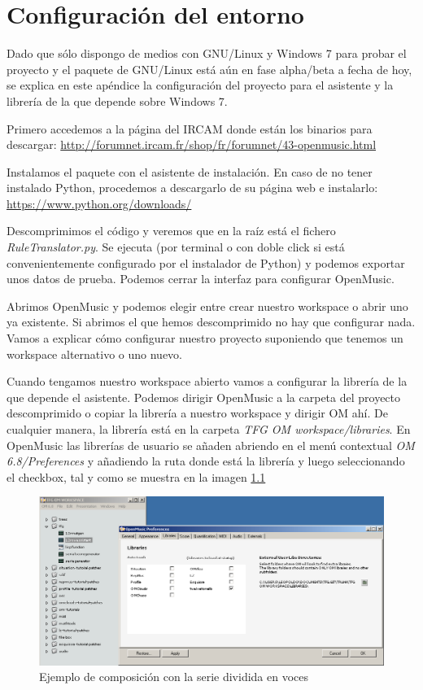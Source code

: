 \documentclass[a4paper,openany,12pt]{memoir}
\begin{document}
\cleardoublepage
{}



\appendix
\chapter{Configuración del entorno}\label{aped.A}
Dado que sólo dispongo de medios con GNU/Linux y Windows 7 para probar el proyecto y el paquete de GNU/Linux está aún en fase alpha/beta a fecha de hoy, se explica en este apéndice la configuración del proyecto para el asistente y la librería de la que depende sobre Windows 7.

Primero accedemos a la página del IRCAM donde están los binarios para descargar: \url{http://forumnet.ircam.fr/shop/fr/forumnet/43-openmusic.html}

Instalamos el paquete con el asistente de instalación. En caso de no tener instalado Python, procedemos a descargarlo de su página web e instalarlo: \url{https://www.python.org/downloads/}

Descomprimimos el código y veremos que en la raíz está el fichero \emph{RuleTranslator.py}. Se ejecuta (por terminal o con doble click si está convenientemente configurado por el instalador de Python) y podemos exportar unos datos de prueba. Podemos cerrar la interfaz para configurar OpenMusic.

Abrimos OpenMusic y podemos elegir entre crear nuestro workspace o abrir uno ya existente. Si abrimos el que hemos descomprimido no hay que configurar nada. Vamos a explicar cómo configurar nuestro proyecto suponiendo que tenemos un workspace alternativo o uno nuevo.

Cuando tengamos nuestro workspace abierto vamos a configurar la librería de la que depende el asistente. Podemos dirigir OpenMusic a la carpeta del proyecto descomprimido o copiar la librería a nuestro workspace y dirigir OM ahí. De cualquier manera, la librería está en la carpeta \emph{TFG OM workspace/libraries}. En OpenMusic las librerías de usuario se añaden abriendo en el menú contextual \emph{OM 6.8/Preferences} y añadiendo la ruta donde está la librería y luego seleccionando el checkbox, tal y como se muestra en la imagen \ref{fig:configom}


\begin{figure}
\centering
\includegraphics[width=\textwidth]{img/configom.png}
\caption{Ejemplo de composición con la serie dividida en voces} \label{fig:configom}
\end{figure}
\end{document}
